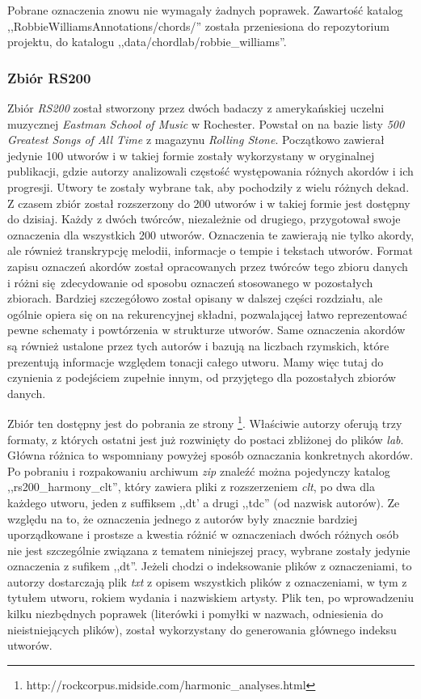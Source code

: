 Pobrane oznaczenia znowu nie wymagały żadnych poprawek. Zawartość katalog
,,RobbieWilliamsAnnotations/chords/'' została przeniesiona do repozytorium projektu, do katalogu
,,data/chordlab/robbie\_williams''.

\subsubsection{Zbiór RS200}

Zbiór \emph{RS200} \cite{de_clercq_corpus_2011} został stworzony przez dwóch badaczy z amerykańskiej
uczelni muzycznej \emph{Eastman School of Music} w Rochester. Powstał on na bazie listy \emph{500
Greatest Songs of All Time} z magazynu \emph{Rolling Stone}. Początkowo zawierał jedynie 100 utworów i w
takiej formie zostały wykorzystany w oryginalnej publikacji, gdzie autorzy analizowali częstość
występowania różnych akordów i ich progresji. Utwory te zostały wybrane tak, aby pochodziły z wielu
różnych dekad. Z czasem zbiór został rozszerzony do 200 utworów i w takiej formie jest dostępny do
dzisiaj. Każdy z dwóch twórców, niezależnie od drugiego, przygotował swoje oznaczenia dla wszystkich
200 utworów. Oznaczenia te zawierają nie tylko akordy, ale również transkrypcję melodii, informacje
o tempie i tekstach utworów. Format zapisu oznaczeń akordów został opracowanych przez twórców tego
zbioru danych i różni się zdecydowanie od sposobu oznaczeń stosowanego w pozostałych zbiorach.
Bardziej szczegółowo został opisany w dalszej części rozdziału, ale ogólnie opiera się on na
rekurencyjnej składni, pozwalającej łatwo reprezentować pewne schematy i powtórzenia w strukturze
utworów. Same oznaczenia akordów są również ustalone przez tych autorów i bazują na liczbach
rzymskich, które prezentują informacje względem tonacji całego utworu. Mamy więc tutaj do
czynienia z podejściem zupełnie innym, od przyjętego dla pozostałych zbiorów danych.

Zbiór ten dostępny jest do pobrania ze strony
\footnote{http://rockcorpus.midside.com/harmonic_analyses.html}. Właściwie autorzy oferują trzy
formaty, z których ostatni jest już rozwinięty do postaci zbliżonej do plików \emph{lab}. Główna
różnica to wspomniany powyżej sposób oznaczania konkretnych akordów. Po pobraniu i rozpakowaniu archiwum
\emph{zip} znaleźć można pojedynczy katalog ,,rs200_harmony_clt'', który zawiera pliki z
rozszerzeniem \emph{clt}, po dwa dla każdego utworu, jeden z suffiksem ,,dt' a drugi ,,tdc'' (od
nazwisk autorów). Ze względu na to, że oznaczenia jednego z autorów były znacznie bardziej
uporządkowane i prostsze a kwestia różnić w oznaczeniach dwóch różnych osób nie jest szczególnie
związana z tematem niniejszej pracy, wybrane zostały jedynie oznaczenia z sufikem ,,dt''. Jeżeli
chodzi o indeksowanie plików z oznaczeniami, to autorzy dostarczają plik \emph{txt} z opisem
wszystkich plików z oznaczeniami, w tym z tytułem utworu, rokiem wydania i nazwiskiem artysty. Plik
ten, po wprowadzeniu kilku niezbędnych poprawek (literówki i pomyłki w nazwach, odniesienia do
nieistniejących plików), został wykorzystany do generowania głównego indeksu utworów.

